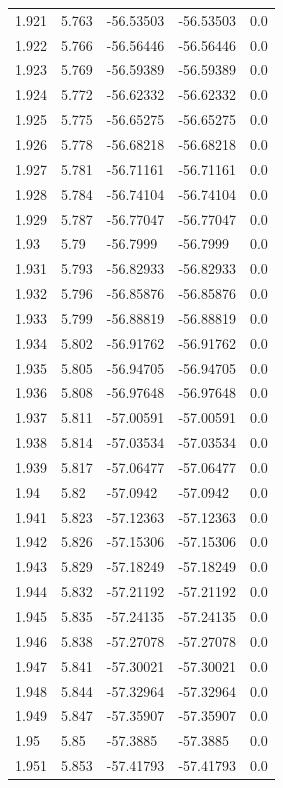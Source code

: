 \begin{tabular}{lllll}
1.921 & 5.763 & -56.53503 & -56.53503 & 0.0 \\
1.922 & 5.766 & -56.56446 & -56.56446 & 0.0 \\
1.923 & 5.769 & -56.59389 & -56.59389 & 0.0 \\
1.924 & 5.772 & -56.62332 & -56.62332 & 0.0 \\
1.925 & 5.775 & -56.65275 & -56.65275 & 0.0 \\
1.926 & 5.778 & -56.68218 & -56.68218 & 0.0 \\
1.927 & 5.781 & -56.71161 & -56.71161 & 0.0 \\
1.928 & 5.784 & -56.74104 & -56.74104 & 0.0 \\
1.929 & 5.787 & -56.77047 & -56.77047 & 0.0 \\
1.93 & 5.79 & -56.7999 & -56.7999 & 0.0 \\
1.931 & 5.793 & -56.82933 & -56.82933 & 0.0 \\
1.932 & 5.796 & -56.85876 & -56.85876 & 0.0 \\
1.933 & 5.799 & -56.88819 & -56.88819 & 0.0 \\
1.934 & 5.802 & -56.91762 & -56.91762 & 0.0 \\
1.935 & 5.805 & -56.94705 & -56.94705 & 0.0 \\
1.936 & 5.808 & -56.97648 & -56.97648 & 0.0 \\
1.937 & 5.811 & -57.00591 & -57.00591 & 0.0 \\
1.938 & 5.814 & -57.03534 & -57.03534 & 0.0 \\
1.939 & 5.817 & -57.06477 & -57.06477 & 0.0 \\
1.94 & 5.82 & -57.0942 & -57.0942 & 0.0 \\
1.941 & 5.823 & -57.12363 & -57.12363 & 0.0 \\
1.942 & 5.826 & -57.15306 & -57.15306 & 0.0 \\
1.943 & 5.829 & -57.18249 & -57.18249 & 0.0 \\
1.944 & 5.832 & -57.21192 & -57.21192 & 0.0 \\
1.945 & 5.835 & -57.24135 & -57.24135 & 0.0 \\
1.946 & 5.838 & -57.27078 & -57.27078 & 0.0 \\
1.947 & 5.841 & -57.30021 & -57.30021 & 0.0 \\
1.948 & 5.844 & -57.32964 & -57.32964 & 0.0 \\
1.949 & 5.847 & -57.35907 & -57.35907 & 0.0 \\
1.95 & 5.85 & -57.3885 & -57.3885 & 0.0 \\
1.951 & 5.853 & -57.41793 & -57.41793 & 0.0 \\

\end{tabular}
